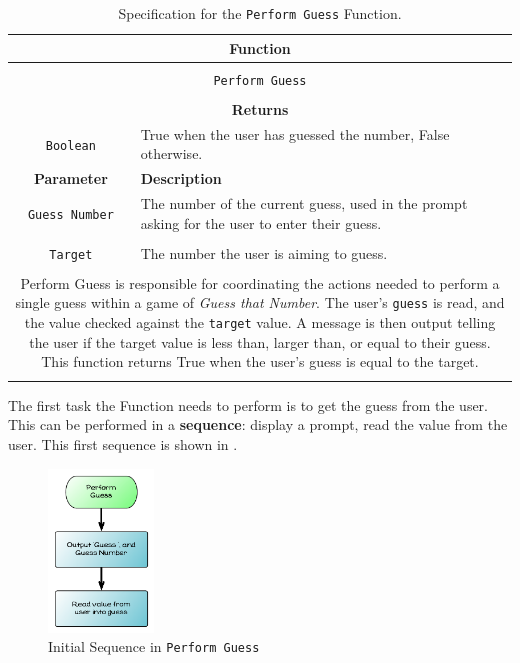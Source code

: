 \begin{table}[h]
  \centering
  \begin{tabular}{|c|p{9cm}|}
    \hline
    \multicolumn{2}{|c|}{\textbf{Function}} \\
    \hline
    \multicolumn{2}{|c|}{} \\
    \multicolumn{2}{|c|}{\texttt{Perform Guess}} \\
    \multicolumn{2}{|c|}{} \\
    \hline
    \multicolumn{2}{|c|}{\textbf{Returns}} \\
    \hline
    \texttt{Boolean} & True when the user has guessed the number, False otherwise. \\
    \hline
    \textbf{Parameter} & \textbf{Description} \\
    \hline
    \texttt{Guess Number} & The number of the current guess, used in the prompt asking for the user to enter their guess. \\
    & \\
    \texttt{Target}   & The number the user is aiming to guess. \\
    \hline
    \multicolumn{2}{|c|}{} \\
    \multicolumn{2}{|p{12cm}|}{Perform Guess is responsible for coordinating the actions needed to perform a single guess within a game of \emph{Guess that Number}. The user's \texttt{guess} is read, and the value checked against the \texttt{target} value. A message is then output telling the user if the target value is less than, larger than, or equal to their guess. This function returns True when the user's guess is equal to the target.} \\
    \multicolumn{2}{|c|}{} \\
    \hline
  \end{tabular}
  \caption{Specification for the \texttt{Perform Guess} Function.}
  \label{tbl:perform guess}
\end{table}

The first task the Function needs to perform is to get the guess from the user. This can be performed in a \textbf{sequence}: display a prompt, read the value from the user. This first sequence is shown in .

\begin{figure}[h]
   \centering
   \includegraphics[width=0.25\textwidth]{./topics/control-flow/diagrams/PerformGuess1} 
   \caption{Initial Sequence in \texttt{Perform Guess}}
   \label{fig:perform-guess-1}
\end{figure}

